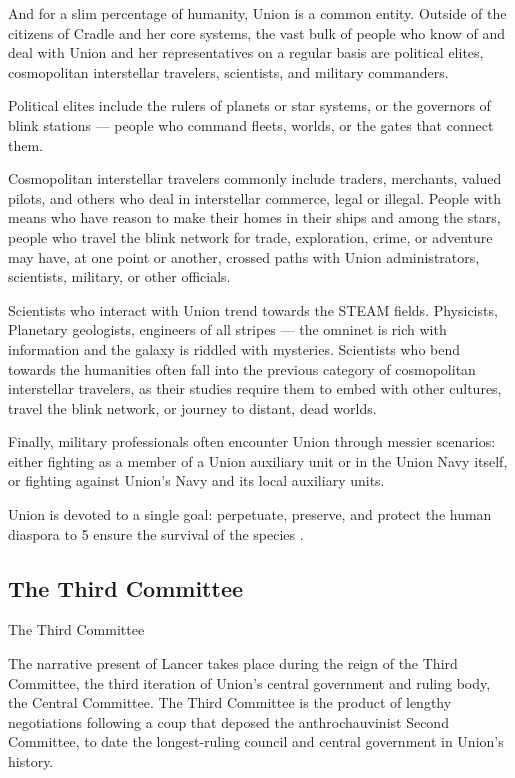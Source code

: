 And for a slim percentage of humanity, Union is a common entity. Outside of the citizens of  
Cradle and her core systems, the vast bulk of people who know of and deal with Union and her  
representatives on a regular basis are political elites, cosmopolitan interstellar travelers,  
scientists, and military commanders. 
 

Political elites include the rulers of planets or star systems, or the governors of blink stations —  
people who command fleets, worlds, or the gates that connect them.   
 

Cosmopolitan interstellar travelers commonly include traders, merchants, valued pilots, and  
others who deal in interstellar commerce, legal or illegal. People with means who have reason to  
make their homes in their ships and among the stars, people who travel the blink network for  
trade, exploration, crime, or adventure may have, at one point or another, crossed paths with  
Union administrators, scientists, military, or other officials. 
 

Scientists who interact with Union trend towards the STEAM fields. Physicists, Planetary  
geologists, engineers of all stripes — the omninet is rich with information and the galaxy is  
riddled with mysteries. Scientists who bend towards the humanities often fall into the previous  
category of cosmopolitan interstellar travelers, as their studies require them to embed with other  
cultures, travel the blink network, or journey to distant, dead worlds.
 

Finally, military professionals often encounter Union through messier scenarios: either fighting as  
a member of a Union auxiliary unit or in the Union Navy itself, or fighting against Union’s Navy  
and its local auxiliary units. 
 

Union is devoted to a single goal: perpetuate, preserve, and protect the human diaspora to  
                                        5 
ensure the survival of the species  .
 
\subsection{The Third Committee}
The Third Committee  

The narrative present of Lancer takes place during the reign of the Third Committee, the third  
iteration of Union’s central government and ruling body, the Central Committee. The Third  
Committee is the product of lengthy negotiations following a coup that deposed the  
anthrochauvinist Second Committee, to date the longest-ruling council and central government in  
Union’s history.   

